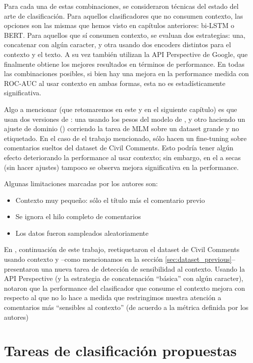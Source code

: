 Para cada una de estas combinaciones, se consideraron técnicas del estado del arte de clasificación. Para aquellos clasificadores que no consumen contexto, las opciones son las mismas que hemos visto en capítulos anteriores: bi-LSTM o BERT. Para aquellos que sí consumen contexto, se evaluan dos estrategias: una, concatenar con algún caracter, y otra usando dos encoders distintos para el contexto y el texto. A su vez también utilizan la API Perspective de Google, que finalmente obtiene los mejores resultados en términos de performance. En todas las combinaciones posibles, si bien hay una mejora en la performance medida con ROC-AUC al usar contexto en ambas formas, esta no es estadísticamente significativa.

Algo a mencionar (que retomaremos en este y en el siguiente capítulo) es que usan dos versiones de \bert{}: una usando los pesos del modelo de \bert{}, y otro haciendo un ajuste de dominio () corriendo la tarea de MLM sobre un dataset grande y no etiquetado. En el caso de el trabajo mencionado, sólo hacen un fine-tuning sobre comentarios sueltos del dataset de Civil Comments. Esto podría tener algún efecto deteriorando la performance al usar contexto; sin embargo, en el \bert{} a secas (sin hacer ajustes) tampoco se observa mejora significativa en la performance.

Algunas limitaciones marcadas por los autores son:

\begin{itemize}
    \item Contexto muy pequeño: sólo el título más el comentario previo
    \item Se ignora el hilo completo de comentarios
    \item Los datos fueron sampleados aleatoriamente
\end{itemize}

En \citet{xenos-2021-context}, continuación de este trabajo, reetiquetaron el dataset de Civil Comments usando contexto y --como mencionamos en la sección \ref{sec:dataset_previous}-- presentaron una nueva tarea de detección de sensibilidad al contexto. Usando la API Perspective (y la estrategia de concatenación ``básica'' con algún caracter), notaron que la performance del clasificador que consume el contexto mejora con respecto al que no lo hace a medida que restringimos nuestra atención a comentarios más ``sensibles al contexto'' (de acuerdo a la métrica definida por los autores)


\section{Tareas de clasificación propuestas}
\label{sec:tasks}

